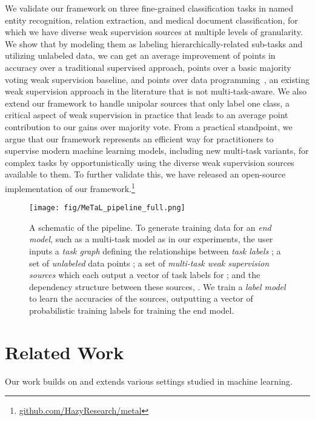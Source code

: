 \documentclass[letterpaper]{article}
\begin{document}
We validate our framework on three fine-grained classification tasks in named entity recognition, relation extraction, and medical document classification, for which we have diverse weak supervision sources at multiple levels of granularity.
We show that by modeling them as labeling hierarchically-related sub-tasks and utilizing unlabeled data, we can get an average improvement of  points in accuracy over a traditional supervised approach,  points over a basic majority voting weak supervision baseline, and  points over data programming~\cite{ratner2016data}, an existing weak supervision approach in the literature that is not multi-task-aware.
We also extend our framework to handle unipolar sources that only label one class, a critical aspect of weak supervision in practice that leads to an average  point contribution to our gains over majority vote.
From a practical standpoint, we argue that our framework represents an efficient way for practitioners to supervise modern machine learning models, including new multi-task variants, for complex tasks by opportunistically using the diverse weak supervision sources available to them.
To further validate this, we have released an open-source implementation of our framework.\footnote{\url{github.com/HazyResearch/metal}}

\begin{figure*}
	\centering
	\texttt{[image: fig/MeTaL\_pipeline\_full.png]}
	\caption{
		A schematic of the \systemx pipeline.
		To generate training data for an \textit{end model}, such as a multi-task model as in our experiments, the user inputs a \textit{task graph}  defining the relationships between \textit{task labels} ; a set of \textit{unlabeled} data points ; a set of \textit{multi-task weak supervision sources}  which each output a vector  of task labels for ; and the dependency structure between these sources, .
		We train a \textit{label model} to learn the accuracies of the sources, outputting a vector of probabilistic training labels  for training the end model.
	}
	\label{fig:ws_pipeline}
\end{figure*} 
\section{Related Work}
\label{sec:related_work}


Our work builds on and extends various settings studied in machine learning.
\end{document}
